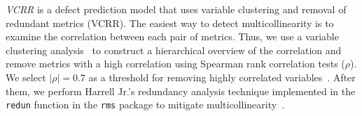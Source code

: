 \emph{VCRR} is a defect prediction model that uses variable clustering and removal of redundant metrics (VCRR). 
The easiest way to detect multicollinearity is to examine the correlation between each pair of metrics. Thus, we use a variable clustering analysis~\cite{SarleTheVarclusProcedure} to construct a hierarchical overview of the correlation and remove metrics with a high correlation using Spearman rank correlation tests ($\rho$). We select $|\rho|=0.7$ as a threshold for removing highly correlated variables~\cite{Kazdin1999meanings}. 
After them, we perform Harrell Jr.'s redundancy analysis technique implemented in the \texttt{redun} function in the \texttt{rms} package to mitigate multicollinearity~\cite{Harrell2006Regression}. 

